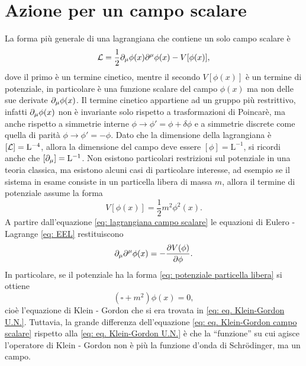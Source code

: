 \section{Azione per un campo scalare}
La forma più generale di una lagrangiana che contiene un solo campo scalare è
\begin{equation}
\label{eq: lagrangiana campo scalare}
    \mathcal{L} = \frac{1}{2}\partial_\mu\phi(x)\partial^\mu\phi(x) - V[\phi(x)],
\end{equation}
dove il primo è un termine cinetico, mentre il secondo $V[\phi(x)]$ è un termine di potenziale, in particolare è una funzione scalare del campo $\phi(x)$ ma non delle sue derivate $\partial_\mu\phi(x)$. Il termine cinetico appartiene ad un gruppo più restrittivo, infatti $\partial_\mu\phi(x)$ non è invariante solo rispetto a trasformazioni di Poincarè, ma anche rispetto a simmetrie interne $\phi\to\phi'=\phi + \delta\phi$ e a simmetrie discrete come quella di parità $\phi\to\phi'=-\phi$. Dato che la dimensione della lagrangiana è $[\mathcal{L}] = \mathrm{L}^{-4}$, allora la dimensione del campo deve essere $[\phi] = \mathrm{L}^{-1}$, si ricordi anche che $[\partial_\mu] = \mathrm{L}^{-1}$. Non esistono particolari restrizioni sul potenziale in una teoria classica, ma esistono alcuni casi di particolare interesse, ad esempio se il sistema in esame consiste in un particella libera di massa $m$, allora il termine di potenziale assume la forma
\begin{equation}
\label{eq: potenziale particella libera}
    V[\phi(x)] = \frac{1}{2}m^2\phi^2(x).
\end{equation}
A partire dall'equazione \eqref{eq: lagrangiana campo scalare} le equazioni di Eulero - Lagrange \eqref{eq: EEL} restituiscono
\begin{equation}
    \partial_\mu\partial^\mu\phi(x) = -\frac{\partial V(\phi)}{\partial \phi}.
\end{equation}
In particolare, se il potenziale ha la forma \eqref{eq: potenziale particella libera} si ottiene
\begin{equation}
\label{eq: eq. Klein-Gordon campo scalare}
    (\square + m^2)\phi(x) = 0,
\end{equation}
cioè l'equazione di Klein - Gordon che si era trovata in \eqref{eq: eq. Klein-Gordon U.N.}. Tuttavia, la grande differenza dell'equazione \eqref{eq: eq. Klein-Gordon campo scalare} rispetto alla \eqref{eq: eq. Klein-Gordon U.N.} è che la ``funzione'' su cui agisce l'operatore di Klein - Gordon non è più la funzione d'onda di Schr\"odinger, ma un campo. 

